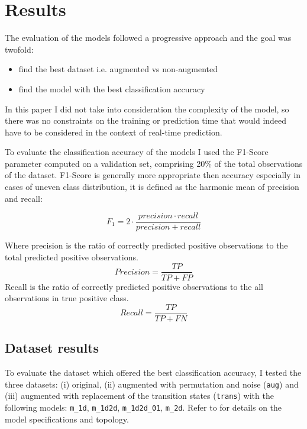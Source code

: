 
\section{Results}
\label{sec:results}

The evaluation of the models followed a progressive approach and the goal was twofold:
\begin{itemize}
\item find the best dataset i.e. augmented vs \mbox{non-augmented}
\item find the model with the best classification accuracy
\end{itemize}
In this paper I did not take into consideration the complexity of the model, so there was no constraints on the training or prediction time that would indeed have to be considered in the context of \mbox{real-time} prediction. \par

To evaluate the classification accuracy of the models I used the \mbox{F1-Score} parameter computed on a validation set, comprising 20\% of the total observations of the dataset. \mbox{F1-Score} is generally more appropriate then accuracy especially in cases of uneven class distribution, it is defined as the harmonic mean of precision and recall:

$$F_1 = 2 \cdot \frac{precision \cdot recall}{precision + recall}$$

Where precision is the ratio of correctly predicted positive observations to the total predicted positive observations.
$$Precision = \frac{TP}{TP+FP}$$
Recall is the ratio of correctly predicted positive observations to the all observations in true positive class.
$$Recall = \frac{TP}{TP+FN}$$

\subsection{Dataset results}
\label{sec:dataset_results}

To evaluate the dataset which offered the best classification accuracy, I tested the three datasets: (i) original, (ii) augmented with permutation and noise (\texttt{aug}) and (iii) augmented with replacement of the transition states (\texttt{trans}) with the following models: \texttt{m_1d}, \texttt{m_1d2d}, \texttt{m_1d2d_01}, \texttt{m_2d}. Refer to  for details on the model specifications and topology.\\

